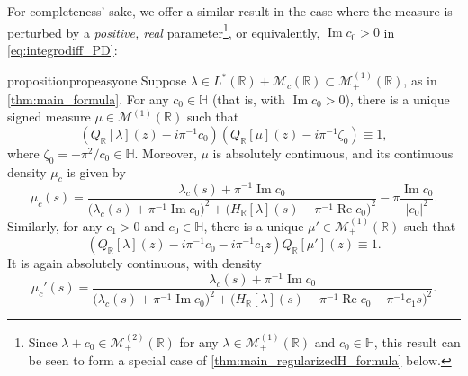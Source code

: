 \documentclass{cams-l} %
\newcommand{\dave}[1]{#1}\newcommand{\davebegin}{}\newcommand{\daveend}{}\newcommand{\george}[1]{#1}
\newcommand{\RR}{\mathbb R}
\newcommand{\HH}{\mathbb H}
\newcommand{\cM}{\mathcal M}
\newcommand{\cB}{\mathcal B}
\newcommand{\op}{\operatorname}
\renewcommand{\Re}{\op{Re}}
\renewcommand{\Im}{\op{Im}}
\theoremstyle{definition}
\theoremstyle{remark}
\numberwithin{equation}{section}
\begin{document}
For completeness' sake, we offer a similar result in the case where the measure is perturbed by a \emph{positive, real} parameter\footnote{\dave{Since $\lambda + c_0\in\cM_+^{(2)}(\RR)$ for any $\lambda\in\cM_+^{(1)}(\RR)$ and $c_0\in\HH$, this result can be seen to form a special case of \cref{thm:main_regularizedH_formula} below.}}, or equivalently, $\Im c_0>0$ in \ref{eq:integrodiff_PD}:
\begin{restatable}[$\cB_\RR$ with complex $c_0$]{proposition}{propeasyone}\label{prop:easyone}
    Suppose $\lambda\in L^*(\RR) + \cM_c(\RR)\subset\cM_+^{(1)}(\RR)$, as in \cref{thm:main_formula}. For any $c_0 \in \HH$ (that is, with $\Im c_0 >0$), there is a unique signed measure $\mu\in\cM^{(1)}(\RR)$ such that
    \begin{equation}
        \left(Q_\RR[\lambda](z) - i\pi^{-1}c_0\right)\left(Q_\RR[\mu](z) - i\pi^{-1}\zeta_0\right)\equiv 1,
    \end{equation}
    where $\zeta_0 = -\pi^2/c_0\in\HH$. Moreover, $\mu$ is absolutely continuous, and its continuous density $\mu_c$ is given by
    \begin{equation}
        \mu_c(s) = \frac{\lambda_c(s) + \pi^{-1}\Im{c_0}}{\big(\lambda_c(s)+\pi^{-1}\Im{c_0}\big)^2 + \big(H_\RR[\lambda](s) - \pi^{-1}\Re{c_0}\big)^2} - \pi\frac{\Im c_0}{|c_0|^2}.
    \end{equation}
    Similarly, for any $c_1>0$ and $c_0\in\HH$, there is a unique $\mu'\in\cM_+^{(1)}(\RR)$ such that
    \begin{equation}
        \left(Q_\RR[\lambda](z) - i\pi^{-1}c_0 - i\pi^{-1}c_1z\right)Q_\RR[\mu'](z)\equiv 1.
    \end{equation}
    It is again absolutely continuous, with density
    \begin{equation}
        \mu_c'(s) = \frac{\lambda_c(s) + \pi^{-1}\Im{c_0}}{\big(\lambda_c(s)+\pi^{-1}\Im{c_0}\big)^2 + \big(H_\RR[\lambda](s) - \pi^{-1}\Re{c_0} - \pi^{-1}c_1s\big)^2}.
    \end{equation}
\end{restatable}
\end{document}
